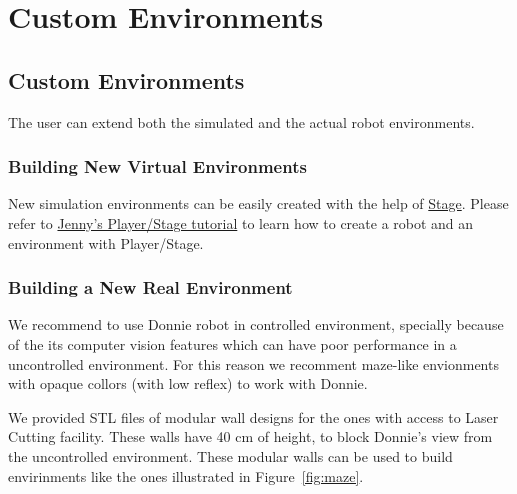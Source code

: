 \chapter{Custom Environments}

\section{Custom Environments}
\label{sec:envs}

The user can extend both the simulated and the actual robot environments.

\subsection{Building New Virtual Environments}

New simulation environments can be easily created with the help of \href{http://playerstage.sourceforge.net/?src=stage}{Stage}.
Please refer to \href{https://github.com/jennyhasahat/Player-Stage-Manual}{Jenny's Player/Stage tutorial} to learn how to create a robot and an environment with Player/Stage. 

\subsection{Building a New Real Environment}

We recommend to use Donnie robot in controlled environment, specially because of the its computer vision 
features which can have poor performance in a uncontrolled environment.
For this reason we recomment maze-like envionments with opaque collors (with low reflex) to work with Donnie.

We provided STL files of modular wall designs for the ones with access to Laser Cutting facility.
These walls have 40 cm of height, to block Donnie's view from the uncontrolled environment.
These modular walls can be used to build envirinments like the ones illustrated in Figure~\ref{fig:maze}.


 
